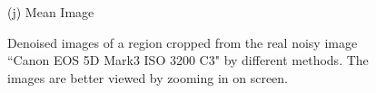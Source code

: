 \documentclass[10pt,onecolumn,letterpaper]{article}
\begin{document}
\begin{figure}[H]
{\begin{minipage}[t]{0.195\textwidth}
{\footnotesize (j) Mean Image \cite{crosschannel2016} }
\end{minipage}
}
\caption{Denoised images of a region cropped from the real noisy image ``Canon EOS 5D Mark3 ISO 3200 C3" \cite{crosschannel2016} by different methods. The images are better viewed by zooming in on screen.} 
\label{fig12}
\end{figure}

\begin{figure}[H]\vspace{1mm}
\centering
{}
\end{figure}
\end{document}
